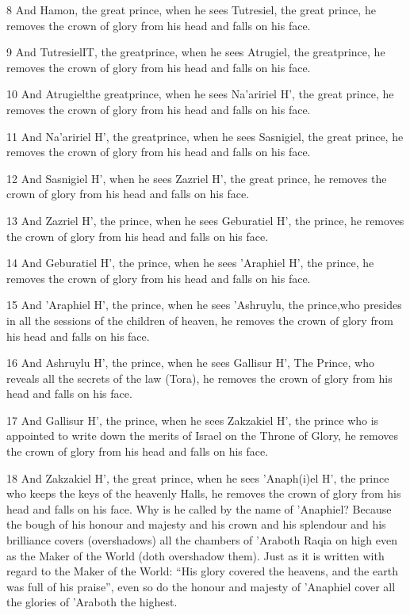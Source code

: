 \par 8 And Hamon, the great prince, when he sees Tutresiel, the great prince, he removes the crown of glory from his head and falls on his face. 

\par 9 And TutresielIT, the greatprince, when he sees Atrugiel, the greatprince, he removes the crown of glory from his head and falls on his face. 

\par 10 And Atrugielthe greatprince, when he sees Na'aririel H', the great prince, he removes the crown of glory from his head and falls on his face. 

\par 11 And Na'aririel H', the greatprince, when he sees Sasnigiel, the great prince, he removes the crown of glory from his head and falls on his face. 

\par 12 And Sasnigiel H', when he sees Zazriel H', the great prince, he removes the crown of glory from his head and falls on his face. 

\par 13 And Zazriel H', the prince, when he sees Geburatiel H', the prince, he removes the crown of glory from his head and falls on his face. 

\par 14 And Geburatiel H', the prince, when he sees 'Araphiel H', the prince, he removes the crown of glory from his head and falls on his face. 

\par 15 And 'Araphiel H', the prince, when he sees 'Ashruylu, the prince,who presides in all the sessions of the children of heaven, he removes the crown of glory from his head and falls on his face. 

\par 16 And Ashruylu H', the prince, when he sees Gallisur H', The Prince, who reveals all the secrets of the law (Tora), he removes the crown of glory from his head and falls on his face. 

\par 17 And Gallisur H', the prince, when he sees Zakzakiel H', the prince who is appointed to write down the merits of Israel on the Throne of Glory, he removes the crown of glory from his head and falls on his face. 

\par 18 And Zakzakiel H', the great prince, when he sees 'Anaph(i)el H', the prince who keeps the keys of the heavenly Halls, he removes the crown of glory from his head and falls on his face. Why is he called by the name of 'Anaphiel? Because the bough of his honour and majesty and his crown and his splendour and his brilliance covers (overshadows) all the chambers of 'Araboth Raqia on high even as the Maker of the World (doth overshadow them). Just as it is written with regard to the Maker of the World: “His glory covered the heavens, and the earth was full of his praise”, even so do the honour and majesty of 'Anaphiel cover all the glories of 'Araboth the highest. 

